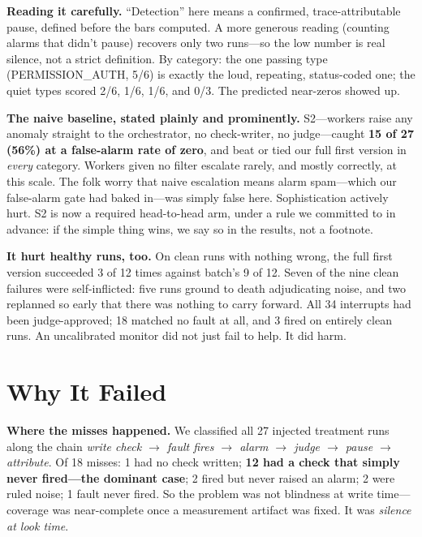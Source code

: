 \documentclass[acmsmall,screen]{acmart}
\begin{document}
\textbf{Reading it carefully.} ``Detection'' here means a confirmed,
trace-attributable pause, defined before the bars computed. A more generous
reading (counting alarms that didn't pause) recovers only two runs---so the low
number is real silence, not a strict definition. By category: the one passing
type (PERMISSION\_AUTH, 5/6) is exactly the loud, repeating, status-coded one;
the quiet types scored 2/6, 1/6, 1/6, and 0/3. The predicted near-zeros showed
up.

\textbf{The naive baseline, stated plainly and prominently.} S2---workers raise
any anomaly straight to the orchestrator, no check-writer, no judge---caught
\textbf{15 of 27 (56\%) at a false-alarm rate of zero}, and beat or tied our
full first version in \emph{every} category. Workers given no filter escalate
rarely, and mostly correctly, at this scale. The folk worry that naive
escalation means alarm spam---which our false-alarm gate had baked in---was
simply false here. Sophistication actively hurt. S2 is now a required
head-to-head arm, under a rule we committed to in advance: if the simple thing
wins, we say so in the results, not a footnote.

\textbf{It hurt healthy runs, too.} On clean runs with nothing wrong, the full
first version succeeded 3 of 12 times against batch's 9 of 12. Seven of the nine
clean failures were self-inflicted: five runs ground to death adjudicating
noise, and two replanned so early that there was nothing to carry forward. All
34 interrupts had been judge-approved; 18 matched no fault at all, and 3 fired
on entirely clean runs. An uncalibrated monitor did not just fail to help. It
did harm.

\section{Why It Failed}
\textbf{Where the misses happened.} We classified all 27 injected treatment
runs along the chain \emph{write check $\rightarrow$ fault fires $\rightarrow$
alarm $\rightarrow$ judge $\rightarrow$ pause $\rightarrow$ attribute}. Of 18
misses: 1 had no check written; \textbf{12 had a check that simply never
fired---the dominant case}; 2 fired but never raised an alarm; 2 were ruled
noise; 1 fault never fired. So the problem was not blindness at write
time---coverage was near-complete once a measurement artifact was fixed. It was
\emph{silence at look time}.
\end{document}
